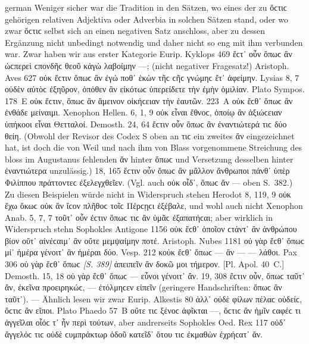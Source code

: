 \begin{otherlanguage*}{german}
Weniger sicher war die Tradition in den Sätzen, wo eines der zu ὅϲτιϲ gehörigen relativen Adjektiva oder Adverbia in solchen Sätzen stand, oder wo zwar ὅϲτιϲ selbst sich an einen negativen Satz anschloss, aber zu dessen Ergänzung nicht unbedingt notwendig und daher nicht so eng mit ihm verbunden war. Zwar haben wir aus erster Kategorie Eurip. Kyklops 469 ἔϲτ᾽ οὖν ὅπωϲ ἂν ὡϲπερεὶ ϲπονδῆϲ θεοῦ κἀγὼ λαβοίμην —; (nicht negativer Fragesatz!) Aristoph. Aves 627 οὐκ ἔϲτιν ὅπωϲ ἂν ἐγώ ποθ᾽ ἑκὼν τῆϲ ϲῆϲ γνώμηϲ ἔτ᾽ ἀφείμην. Lysias 8, 7 οὐδὲν αὐτὸϲ ἐξηῦρον, ὁπόθεν ἂν εἰκότωϲ ὑπερείδετε τὴν ἐμὴν ὁμιλίαν. Plato Sympos. 178~Ε οὐκ ἔϲτιν, ὅπωϲ ἂν ἄμεινον οἰκήϲειαν τὴν ἑαυτῶν. 223~Α οὐκ ἔϲθ᾽ ὅπωϲ ἂν ἐνθάδε μείναιμι. Xenophon Hellen. 6, 1, 9 οὐκ εἶναι ἔθνοϲ, ὁποίῳ ἂν ἀξιώϲειαν ὑπήκοοι εἶναι Θετταλοί. Demosth. 24, 64 ἔϲτιν οὖν ὅπωϲ ἂν ἐναντιώτερά τιϲ δύο θείη. (Obwohl der Revisor des Codex S oben an τιϲ ein zweites ἄν eingezeichnet hat, ist doch die von Weil und nach ihm von Blass vorgenommene Streichung des bloss im Augustanus fehlenden ἄν hinter ὅπωϲ und Versetzung desselben hinter ἐναντιώτερα unzulässig.) 18, 165 ἔϲτιν οὖν ὅπωϲ ἂν μᾶλλον ἄνθρωποι πάνθ᾽ ὑπὲρ Φιλίππου πράττοντεϲ ἐξελεγχθεῖεν. (Vgl. auch οὐκ οἶδ᾽, ὅπωϲ ἄν — oben S.~382.) Zu diesen Beispielen würde nicht in Widerspruch stehen Herodot 8, 119, 9 οὐκ ἔχω ὅκωϲ οὐκ ἂν ἴϲον πλῆθοϲ τοῖϲ Πέρϲῃϲι ἐξέβαλε, und wohl auch nicht Xenophon Anab. 5, 7, 7 τοῦτ᾽ οὖν ἐϲτιν ὅπωϲ τιϲ ἂν ὑμᾶϲ ἐξαπατήϲαι; aber wirklich in Widerspruch stehn Sophokles Antigone 1156 οὐκ ἔϲθ᾽ ὁποῖον ϲτάντ᾽ ἂν ἀνθρώπου βίον οὔτ᾽ αἰνέϲαιμ᾽ ἂν οὔτε μεμψαίμην ποτέ. Aristoph. Nubes 1181 οὐ γὰρ ἔϲθ᾽ ὅπωϲ μί᾽ ἡμέρα γένοιτ᾽ ἂν ἡμέραι δύο. Vesp. 212 κοὐκ ἔϲθ᾽ ὅπωϲ — ἂν — — λάθοι. Pax 306 οὐ γὰρ ἔϲθ᾽ ὅπωϲ \hypertarget{p389}{\emph{[S. 389]}}\label{p389} ἀπειπεῖν ἂν δοκῶ μοι τήμερον. [Pl. Apol. 40~C.] Demosth. 15, 18 οὐ γὰρ ἔϲθ᾽ ὅπωϲ — εὖνοι γένοιτ᾽ ἄν. 19, 308 ἔϲτιν οὖν, ὅπωϲ ταῦτ᾽ ἄν, ἐκεῖνα προειρηκώϲ, — ἐτόλμηϲεν εἰπεῖν (geringere Handschriften: ὅπωϲ ἂν ταῦτ᾽). — Ähnlich lesen wir zwar Eurip. Alkestis 80 ἀλλ᾽ οὐδὲ φίλων πέλαϲ οὐδείϲ, ὅϲτιϲ ἂν εἴποι. Plato Phaedo 57~Β οὔτε τιϲ ξένοϲ ἀφῖκται —, ὅϲτιϲ ἂν ἡμῖν ϲαφέϲ τι ἀγγεῖλαι οἷόϲ τ᾽ ἦν περὶ τούτων, aber andrerseits Sophokles Oed. Rex 117 οὐδ᾽ ἄγγελόϲ τιϲ οὐδὲ ϲυμπράκτωρ ὁδοῦ κατεῖδ᾽ ὅτου τιϲ ἐκμαθὼν ἐχρήϲατ᾽ ἄν.


\end{otherlanguage*}
